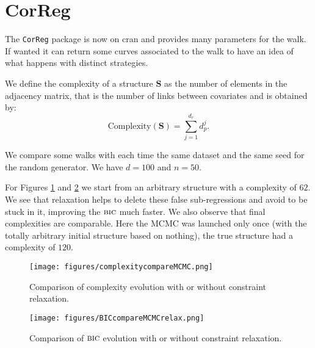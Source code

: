 \documentclass[12pt,a4paper]{report}
\begin{document}
			

\section{CorReg}	
	The {\tt CorReg} package is now on {\sc cran} and provides many parameters for the walk. If wanted it can return some curves associated to the walk to have an idea of what happens with distinct strategies. 		
	
We define the complexity of a structure $\boldsymbol{S}$ as the number of elements in the adjacency matrix, that is the number of links between covariates and is obtained by:
\begin{equation}
	\textrm{Complexity}(\boldsymbol{S})=\sum_{j=1}^{d_r}d_p^j. \nonumber
\end{equation}	
	
		We compare some walks with each time the same dataset and the same seed for the random generator. We have $d=100$ and $n=50$.
		
		For Figures \ref{comparecomplrelax} and \ref{compareBICrelax} we start from an arbitrary structure with a complexity of $62$. We see that relaxation helps to delete these false sub-regressions and avoid to be stuck in it, improving the $\mbox{{\sc bic}}$ much faster. We also observe that final complexities are comparable. Here the MCMC was launched only once (with the totally arbitrary initial structure based on nothing), the true structure had a complexity of $120$.
		
\begin{center}
	\begin{figure}[h!]
	\centering
\texttt{[image: figures/complexitycompareMCMC.png]} 		
\caption{Comparison of complexity evolution with or without constraint relaxation.}\label{comparecomplrelax}
	\end{figure}
	\end{center}
			
\begin{center}
	\begin{figure}[h!]
	\centering
\texttt{[image: figures/BICcompareMCMCrelax.png]} 		
\caption{Comparison of $\mbox{{\sc bic}}$ evolution with or without constraint relaxation.}\label{compareBICrelax}
	\end{figure}
	\end{center}
	
\FloatBarrier
\end{document}
